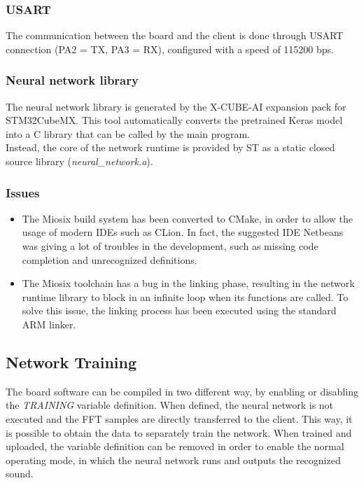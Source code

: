 \subsubsection{USART}
The communication between the board and the client is done through USART connection (PA2 = TX, PA3 = RX), configured with a speed of 115200 bps.

\subsubsection{Neural network library}
The neural network library is generated by the X-CUBE-AI expansion pack for STM32CubeMX. This tool automatically converts the pretrained Keras model into a C library that can be called by the main program.\\
Instead, the core of the network runtime is provided by ST as a static closed source library (\textit{neural\_network.a}).

\subsubsection{Issues}
\begin{itemize}
    \item The Miosix build system has been converted to CMake, in order to allow the usage of modern IDEs such as CLion. In fact, the suggested IDE Netbeans was giving a lot of troubles in the development, such as missing code completion and unrecognized definitions.
    \item The Miosix toolchain has a bug in the linking phase, resulting in the network runtime library to block in an infinite loop when its functions are called. To solve this issue, the linking process has been executed using the standard ARM linker.
\end{itemize}

\subsection{Network Training}
The board software can be compiled in two different way, by enabling or disabling the \textit{TRAINING} variable definition. When defined, the neural network is not executed and the FFT samples are directly transferred to the client. This way, it is possible to obtain the data to separately train the network. When trained and uploaded, the variable definition can be removed in order to enable the normal operating mode, in which the neural network runs and outputs the recognized sound.

